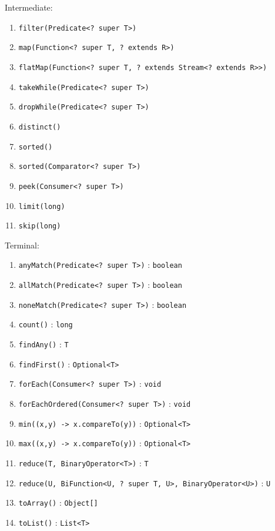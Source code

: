 \documentclass[12pt, a4paper]{article}
\begin{document}
\begin{multicols*}{2}
Intermediate:
\begin{enumerate}[\roman*.]
  \item \lstinline|filter(Predicate<? super T>)|
  \item \lstinline|map(Function<? super T, ? extends R>)|
  \item \lstinline|flatMap(Function<? super T, ? extends Stream<? extends R>>)|
  \item \lstinline|takeWhile(Predicate<? super T>)|
  \item \lstinline|dropWhile(Predicate<? super T>)|
  \item \lstinline|distinct()|
  \item \lstinline|sorted()|
  \item \lstinline|sorted(Comparator<? super T>)|
  \item \lstinline|peek(Consumer<? super T>)|
  \item \lstinline|limit(long)|
  \item \lstinline|skip(long)|
\end{enumerate}

Terminal:
\begin{enumerate}[\roman*.]
  \item \lstinline|anyMatch(Predicate<? super T>)| : \lstinline|boolean|
  \item \lstinline|allMatch(Predicate<? super T>)| : \lstinline|boolean|
  \item \lstinline|noneMatch(Predicate<? super T>)| : \lstinline|boolean|
  \item \lstinline|count()| : \lstinline|long|
  \item \lstinline|findAny()| : \lstinline|T|
  \item \lstinline|findFirst()| : \lstinline|Optional<T>|
  \item \lstinline|forEach(Consumer<? super T>)| : \lstinline|void|
  \item \lstinline|forEachOrdered(Consumer<? super T>)| : \lstinline|void|
  \item \lstinline|min((x,y) -> x.compareTo(y))| : \lstinline|Optional<T>|
  \item \lstinline|max((x,y) -> x.compareTo(y))| : \lstinline|Optional<T>|
  \item \lstinline|reduce(T, BinaryOperator<T>)| : \lstinline|T|
  \item \lstinline|reduce(U, BiFunction<U, ? super T, U>, BinaryOperator<U>)| : \lstinline|U|
  \item \lstinline|toArray()| : \lstinline|Object[]|
  \item \lstinline|toList()| : \lstinline|List<T>|
\end{enumerate}


\end{multicols*}
\end{document}
